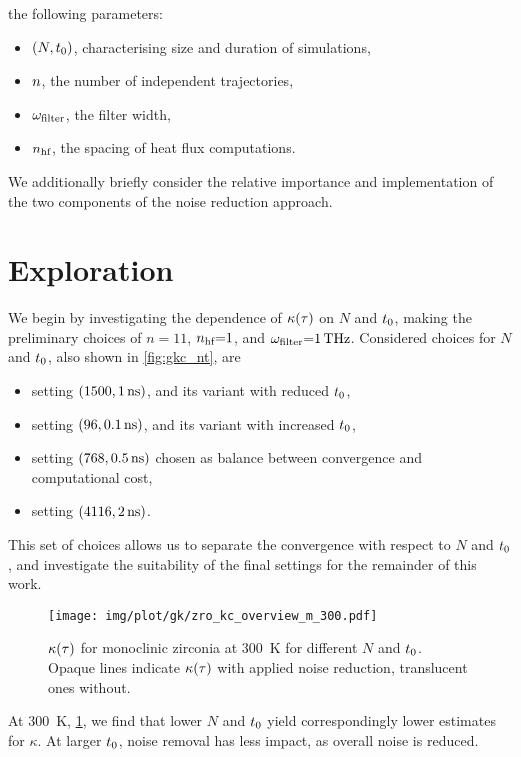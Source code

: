  the following parameters:
\begin{itemize}[itemsep=0pt,topsep=0.5\baselineskip]
  \item $(N,t_0)$, characterising size and duration of simulations,
  \item $n$, the number of independent trajectories,
  \item $\omega_{\text{filter}}$, the filter width,
  \item $n_{\text{hf}}$, the spacing of heat flux computations.
\end{itemize}
We additionally briefly consider the relative importance and implementation of the two components of the noise reduction approach.

\section{Exploration}
\label{sec:gkc_explore}

We begin by investigating the dependence of $\kappa(\tau)$ on $N$ and $t_0$, making the preliminary choices of $n{=}11$, $n_{\text{hf}}{=}1$, and $\omega_{\text{filter}}{=}\qty{1}{THz}$.
Considered choices for $N$ and $t_0$, also shown in \cref{fig:gkc_nt}, are
\begin{itemize}[itemsep=0pt,topsep=0.5\baselineskip]
  \item {} setting $(1500, \qty{1}{ns})$, and its variant with reduced $t_0$,
  \item {} setting $(96, \qty{0.1}{ns})$, and its variant with increased $t_0$,
  \item {} setting $(768, \qty{0.5}{ns})$ chosen as balance between convergence and computational cost,
  \item {} setting $(4116, \qty{2}{ns})$.
\end{itemize}
This set of choices allows us to separate the convergence with respect to $N$ and $t_0$, and investigate the suitability of the final settings for the remainder of this work.

\begin{figure}
  \texttt{[image: img/plot/gk/zro\_kc\_overview\_m\_300.pdf]}
  \caption{
  $\kappa(\tau)$ for monoclinic zirconia at \qty{300}{K} for different $N$ and $t_0$.
  Opaque lines indicate $\kappa(\tau)$ with applied noise reduction, translucent ones without.
  }
  \label{fig:gkc_overview_m_300}
\end{figure}
\noindent
At \qty{300}{K}, \cref{fig:gkc_overview_m_300}, we find that lower $N$ and $t_0$ yield correspondingly lower estimates for $\kappa$. 
At larger $t_0$, noise removal has less impact, as overall noise is reduced.

